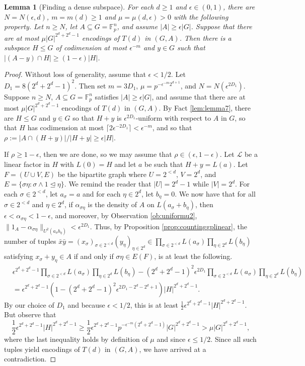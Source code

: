 \documentclass[12pt,oneside,british,a4wide]{amsart}
\newtheorem{lemma}[theorem]{Lemma}
\numberwithin{equation}{section}
\theoremstyle{definition}
\def\F{\mathbb{F}}
\def\e{\epsilon}
\newcommand{\xbar}{\bar{x}}
\newcommand{\ybar}{\bar{y}}
\newcommand{\calL}{\mathcal{L}}
\begin{document}
\begin{lemma}[Finding a dense subspace]\label{fact:densesubspace}
For each $d\geq 1$ and $\e\in (0,1)$, there are $N=N(\e,d)$, $m=m(d)\geq 1$ and $\mu=\mu(d,\e)>0$ with the following property.  Let $n\geq N$, let $A\subseteq G=\F_p^n$, and assume $|A|\geq \e |G|$.   Suppose that there are at most $\mu|G|^{2^d+2^d-1}$ encodings of $T(d)$ in $(G, A)$.  Then there is a subspace $H\leqslant G$ of codimension at most $\e^{-m}$   and $y\in G$ such that $|(A-y)\cap H|\geq (1-\e)|H|$.  
\end{lemma}
\begin{proof}
Without loss of generality, assume that $\e<1/2$.  Let $D_1=8(2^d+2^d-1)^2$.  Then set  $m=3D_1$, $\mu=p^{-\e^{-m}2^{d+1}}$, and $N=N(\e^{2D_1})$.  Suppose $n\geq N$, $A\subseteq G=\F_p^n$ satisfies $|A|\geq \e |G|$, and assume that there are at most $\mu |G|^{2^d+2^d-1}$ encodings of $T(d)$ in $(G,A)$.  By Fact \ref{lem:lemma7},  there are $H\leqslant G$ and $y\in G$ so that $H+y$ is $\e^{2D_1}$-uniform with respect to $A$ in $G$, so that $H$ has codimension at most $\lceil 2\e^{-2D_1}\rceil <\e^{-m}$, and so that $\rho:=|A\cap (H+y)|/|H+y|\geq \e |H|$.  

If $\rho\geq 1-\e$, then we are done, so we may assume that $\rho\in (\e,1-\e)$. Let $\calL$ be a linear factor in $H$ with $L(0)=H$ and let $a$ be such that $H+y=L(a)$.  Let $F=(U\cup V, E)$ be the bipartite graph where $U=2^{<d}$, $V=2^d$, and $E=\{\sigma \eta: \sigma \wedge 1\trianglelefteq \eta\}$.  We remind the reader that $|U|=2^d-1$ while $|V|=2^d$.  For each $\sigma\in 2^{<d}$, let $a_{\sigma}=a$ and for each $\eta\in 2^d$, let $b_{\eta}=0$.  We now have that for all $\sigma\in 2^{<d}$ and $\eta\in 2^d$, if $\alpha_{\sigma\eta}$ is the density of $A$ on $L(a_{\sigma}+b_{\eta})$, then $\e<\alpha_{\sigma\eta}<1-\e$, and moreover, by Observation \ref{ob:uniformu2},   $\|1_{A}-\alpha_{\sigma\eta}\|_{U^2(a_{\sigma}b_{\eta})}<\e^{2D_1}$.   Thus, by Proposition \ref{prop:countinggplinear}, the number of tuples $\xbar\ybar=(x_{\sigma})_{\sigma\in 2^{<d}}(y_{\eta})_{\eta\in 2^d}\in \prod_{\sigma\in 2^{<d}}L(a_{\sigma})\prod_{\eta\in 2^d}L(b_{\eta})$ satisfying $x_{\sigma}+y_{\eta}\in A$ if and only if $\sigma\eta\in E(F)$, is at least the following.
\begin{align*}
&\e^{2^d+2^d-1}\prod_{\sigma\in 2^{<d}}L(a_{\sigma})\prod_{\eta\in 2^d}L(b_{\eta}) - (2^d+2^d-1)^2\e^{2D_1}\prod_{\sigma\in 2^{<d}}L(a_{\sigma})\prod_{\eta\in 2^d}L(b_{\eta})\\
&=\e^{2^d+2^d-1}(1-(2^d+2^d-1)^2\e^{2D_1-2^d-2^d+1})|H|^{2^d+2^d-1}.
\end{align*}
By our choice of $D_1$ and because $\e<1/2$, this is at least  $\frac{1}{2}\e^{2^d+2^d-1}|H|^{2^d+2^d-1}$. But observe that
 $$
 \frac{1}{2}\e^{2^d+2^d-1}|H|^{2^d+2^d-1}\geq \frac{1}{2}\e^{2^d+2^d-1}p^{-\e^{-m}(2^d+2^d-1)}|G|^{2^d+2^d-1}>\mu |G|^{2^d+2^d-1},
 $$
 where the last inequality holds by definition of $\mu$ and since $\e\leq 1/2$.  Since all such tuples yield encodings of $T(d)$ in $(G, A)$, we have arrived at a contradiction. 
\end{proof}
\end{document}
